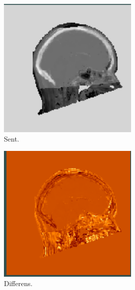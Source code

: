 \begin{figure}
    \begin{subfigure}{0.3\textwidth}
        \centering
        \includegraphics[width=0.75\textwidth]{colager/over_tid_sct/over_tid_sct_140547_late.png}
        \caption{Sent.}
        \label{col:over_time_sct_pat2_late}
    \end{subfigure}\hfill
    \begin{subfigure}{0.3\textwidth}
        \centering
        \includegraphics[width=0.75\textwidth]{colager/over_tid_sct/over_tid_sct_140547_sub.png}
        \caption{Differens.}
        \label{col:over_time_sct_pat2_sub}
    \end{subfigure}\\
    \begin{subfigure}{0.3\textwidth}

\end{subfigure}
\end{figure}
